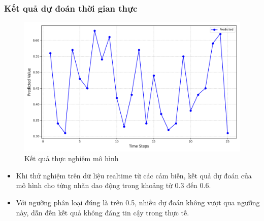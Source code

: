 \subsubsection{Kết quả dự đoán thời gian thực}
\begin{figure}[H]
    \centering
    \includegraphics[width=\textwidth,height=\textheight,keepaspectratio]{Images/Experimental results/model.png}
    \caption{Kết quả thực nghiệm mô hình}
    \label{fig:enter-label}
\end{figure}
\begin{itemize}
    \item Khi thử nghiệm trên dữ liệu realtime từ các cảm biến, kết quả dự đoán của mô hình cho từng nhãn dao động trong khoảng từ 0.3 đến 0.6.
    \item Với ngưỡng phân loại đúng là trên 0.5, nhiều dự đoán không vượt qua ngưỡng này, dẫn đến kết quả không đáng tin cậy trong thực tế.
\end{itemize}

